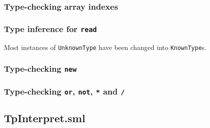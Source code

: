 \documentclass{article}
\newcommand{\Cfile}[4][SML]{ }
\begin{document}
\begin{appendix}
\subsubsection{Type-checking array indexes}
\Cfile{Type.sml}{159}{177}
%    
\subsubsection{Type inference for \texttt{read}}
Most instances of \texttt{UnknownType} have been changed into \texttt{KnownType}s.
\Cfile{Type.sml}{179}{283}
%    
\subsubsection{Type-checking \texttt{new}}
\Cfile{Type.sml}{316}{333}
%    
\subsubsection{Type-checking \texttt{or}, \texttt{not}, \texttt{*} and \texttt{/}}
\Cfile{Type.sml}{201}{220}
%    
\Cfile{Type.sml}{265}{283}
%    

\subsection{TpInterpret.sml}
\Cfile{TpInterpret.sml}{121}{129}
%    
\Cfile{TpInterpret.sml}{494}{507}
%    
\Cfile{TpInterpret.sml}{527}{534}
%    
\Cfile{TpInterpret.sml}{163}{183}
%    
\end{appendix}
\end{document}
